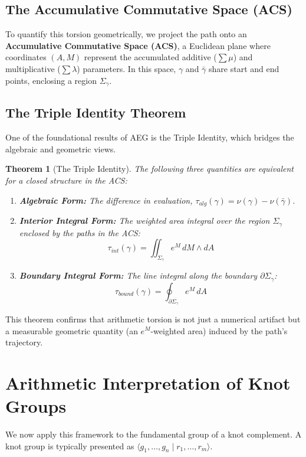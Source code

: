 \documentclass[a4paper,12pt]{article}
\newtheorem{theorem}{Theorem}[section]
\begin{document}
\subsection{The Accumulative Commutative Space (ACS)}
To quantify this torsion geometrically, we project the path onto an \textbf{Accumulative Commutative Space (ACS)}, a Euclidean plane where coordinates $(A, M)$ represent the accumulated additive ($\sum \mu$) and multiplicative ($\sum \lambda$) parameters. In this space, $\gamma$ and $\bar{\gamma}$ share start and end points, enclosing a region $\Sigma_\gamma$.

\subsection{The Triple Identity Theorem}
One of the foundational results of AEG is the Triple Identity, which bridges the algebraic and geometric views.

\begin{theorem}[The Triple Identity]
The following three quantities are equivalent for a closed structure in the ACS:
\begin{enumerate}
    \item \textbf{Algebraic Form:} The difference in evaluation, $\tau_{alg}(\gamma) = \nu(\gamma) - \nu(\bar{\gamma})$.
    \item \textbf{Interior Integral Form:} The weighted area integral over the region $\Sigma_\gamma$ enclosed by the paths in the ACS:
    \[ \tau_{int}(\gamma) = \iint_{\Sigma_\gamma} e^M \, dM \wedge dA \]
    \item \textbf{Boundary Integral Form:} The line integral along the boundary $\partial \Sigma_\gamma$:
    \[ \tau_{bound}(\gamma) = \oint_{\partial \Sigma_\gamma} e^M \, dA \]
\end{enumerate}
\end{theorem}

This theorem confirms that arithmetic torsion is not just a numerical artifact but a measurable geometric quantity (an $e^M$-weighted area) induced by the path's trajectory.

\section{Arithmetic Interpretation of Knot Groups}

We now apply this framework to the fundamental group of a knot complement. A knot group is typically presented as $\langle g_1, \dots, g_n \mid r_1, \dots, r_m \rangle$.
\end{document}
